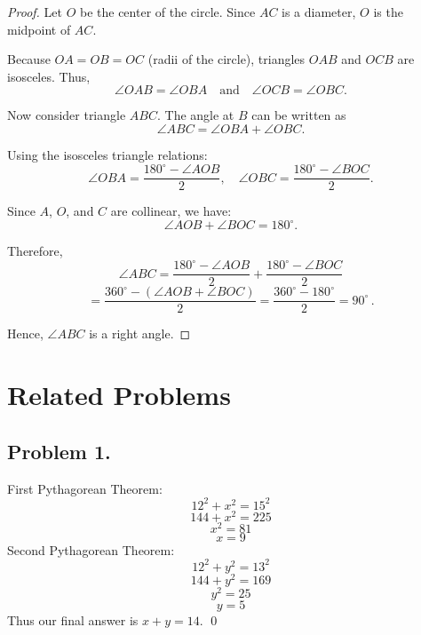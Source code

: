 \documentclass{article}
\begin{document}
\begin{proof}
Let $O$ be the center of the circle. Since $AC$ is a diameter, $O$ is the midpoint of $AC$.

Because $OA = OB = OC$ (radii of the circle), triangles $OAB$ and $OCB$ are isosceles. 
Thus,
\[
\angle OAB = \angle OBA \quad \text{and} \quad \angle OCB = \angle OBC.
\]

Now consider triangle $ABC$. The angle at $B$ can be written as
\[
\angle ABC = \angle OBA + \angle OBC.
\]

Using the isosceles triangle relations:
\[
\angle OBA = \frac{180^\circ - \angle AOB}{2}, \quad
\angle OBC = \frac{180^\circ - \angle BOC}{2}.
\]

Since $A$, $O$, and $C$ are collinear, we have:
\[
\angle AOB + \angle BOC = 180^\circ.
\]

Therefore,
\[
\angle ABC 
= \frac{180^\circ - \angle AOB}{2} + \frac{180^\circ - \angle BOC}{2}
\]
\[
= \frac{360^\circ - (\angle AOB + \angle BOC)}{2}
= \frac{360^\circ - 180^\circ}{2}
= \boxed{90^\circ} \, .
\]


Hence, $\angle ABC$ is a right angle.
\end{proof}

\newpage

\section{Related Problems}
\subsection{Problem 1.}

First Pythagorean Theorem:
\begin{equation}
    12^2 + x^2 = 15^2
\end{equation}
\begin{equation}
    144+x^2 = 225
\end{equation}
\begin{equation}
    x^2 = 81
\end{equation}
\begin{equation}
    x = 9
\end{equation}
Second Pythagorean Theorem:
\begin{equation}
    12^2 + y^2 = 13^2
\end{equation}
\begin{equation}
    144 + y^2 = 169
\end{equation}
\begin{equation}
    y^2 = 25
\end{equation}
\begin{equation}
    y = 5
\end{equation}
Thus our final answer is $x + y = 14$. \qed
\end{document}
